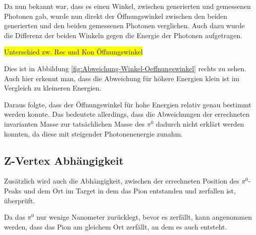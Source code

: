 \documentclass[a4paper,11pt,oneside,final,german,openbib,pdftex]{scrbook}
\begin{document}
{Da nun bekannt war, dass es einen Winkel, zwischen generierten und gemessenen Photonen gab, wurde nun direkt der \"Offnungswinkel zwischen den beiden generierten und den beiden gemessenen Photonen verglichen. Auch dazu wurde die Differenz der beiden Winkeln gegen die Energie der Photonen aufgetragen. 
%		
%	

\colorbox{yellow}{Unterschied zw. Rec und Kon \"Offnungswinkel}

Dies ist in Abbildung \ref{fig:Abweichung-Winkel-Oeffnungswinkel} rechts zu sehen. Auch hier erkennt man, dass die Abweichung f\"ur h\"ohere Energien klein ist im Vergleich zu kleineren Energien. 

Daraus folgte, dass der \"Offnungswinkel f\"ur hohe Energien relativ genau bestimmt werden konnte. Das bedeutete allerdings, dass die Abweichungen der errechneten invarianten Masse zur tats\"achlichen Masse des $\pi^0$ dadurch nicht erkl\"art werden konnten, da diese mit steigender Photonenenergie zunahm. 




\subsection{Z-Vertex Abh\"angigkeit}
\label{sec:Z-Vertex-Abhaengigkeit}


Zusätzlich wird auch die Abh\"angigkeit, zwischen der errechneten  Position des $\pi^0$-Peaks und dem Ort im Target in dem das Pion entstanden und zerfallen ist, \"uberpr\"uft. 

Da das $\pi^0$ nur wenige Nanometer zur\"ucklegt, bevor es zerf\"allt, kann angenommen werden, dass das Pion am gleichem Ort zerf\"allt, an dem es auch entsteht.

 
}
\end{document}
